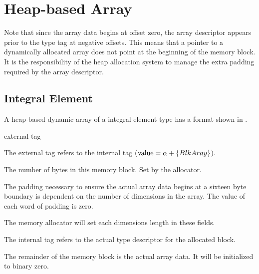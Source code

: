 \section{Heap-based Array}\label{memlay:heap-array}

Note that since the array data begins at offset zero, the array
descriptor appears prior to the type tag at negative offsets.  This
means that a pointer to a dynamically allocated array does not point
at the beginning of the memory block.  It is the responsibility of the
heap allocation system to manage the extra padding required by the
array descriptor.

\subsection{Integral Element}

A heap-based dynamic array of a integral element type has a format
shown in .

\begin{TDfields}{external tag}
  \item[external tag] The external tag refers to the internal tag
    ($\textrm{value} = \alpha + \left\lbrace BlkAray \right\rbrace$).

  \item[block size] The number of bytes in this memory block.  Set by
    the allocator.

  \item[padding] The padding necessary to ensure the actual array data
    begins at a sixteen byte boundary is dependent on the number of
    dimensions in the array.  The value of each word of padding is
    zero.

  \item[\texttt{LEN}] The memory allocator will set each dimensions
    length in these fields.

  \item[internal tag]  The internal tag refers to the actual type
    descriptor for the allocated block.

  \item[array data]  The remainder of the memory block is the actual
    array data.  It will be initialized to binary zero.
\end{TDfields}

